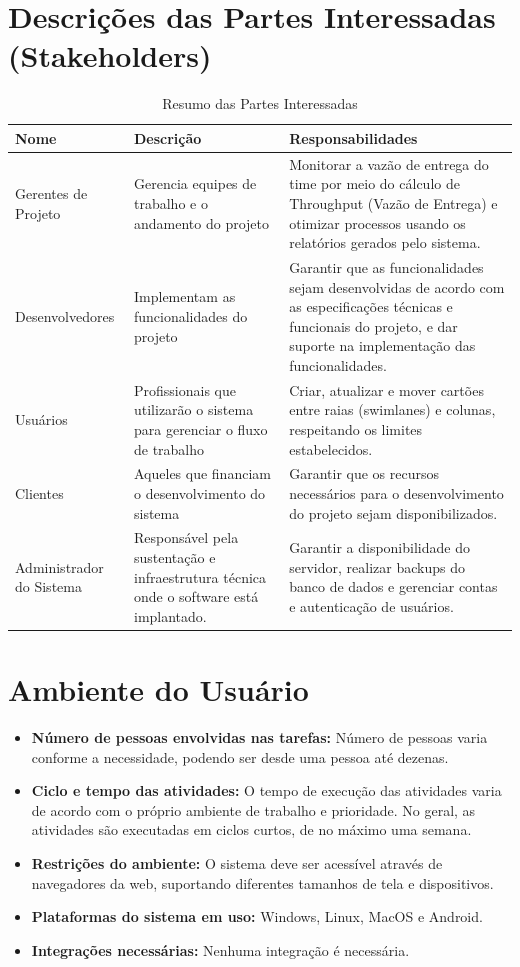 \section{Descrições das Partes Interessadas (Stakeholders)}
\begin{table}[H]
    \centering
    \begin{tabular}{|p{3cm}|p{5cm}|p{6cm}|}
        \hline
        \textbf{Nome} & \textbf{Descrição} & \textbf{Responsabilidades} \\ \hline
        Gerentes de Projeto & Gerencia equipes de trabalho e o andamento do projeto & Monitorar a vazão de entrega do time por meio do cálculo de Throughput (Vazão de Entrega) e otimizar processos usando os relatórios gerados pelo sistema. \\ \hline
        Desenvolvedores & Implementam as funcionalidades do projeto & Garantir que as funcionalidades sejam desenvolvidas de acordo com as especificações técnicas e funcionais do projeto, e dar suporte na implementação das funcionalidades. \\ \hline
        Usuários & Profissionais que utilizarão o sistema para gerenciar o fluxo de trabalho & Criar, atualizar e mover cartões entre raias (swimlanes) e colunas, respeitando os limites estabelecidos. \\ \hline
        Clientes & Aqueles que financiam o desenvolvimento do sistema & Garantir que os recursos necessários para o desenvolvimento do projeto sejam disponibilizados. \\ \hline    
        Administrador do Sistema & Responsável pela sustentação e infraestrutura técnica onde o software está implantado. & Garantir a disponibilidade do servidor, realizar backups do banco de dados e gerenciar contas e autenticação de usuários. \\ \hline    
    \end{tabular}
    \caption{Resumo das Partes Interessadas}
\end{table}

\section{Ambiente do Usuário}
\begin{itemize}
    \item \textbf{Número de pessoas envolvidas nas tarefas:} Número de pessoas varia conforme a necessidade, podendo ser desde uma pessoa até dezenas.
    \item \textbf{Ciclo e tempo das atividades:} O tempo de execução das atividades varia de acordo com o próprio ambiente de trabalho e prioridade. No geral, as atividades são executadas em ciclos curtos, de no máximo uma semana.
    \item \textbf{Restrições do ambiente:} O sistema deve ser acessível através de navegadores da web, suportando diferentes tamanhos de tela e dispositivos.
    \item \textbf{Plataformas do sistema em uso:} Windows, Linux, MacOS e Android.
    \item \textbf{Integrações necessárias:} Nenhuma integração é necessária.
\end{itemize}

